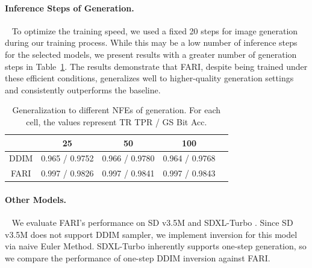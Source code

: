\documentclass{article}
\begin{document}
\begin{table}[htbp]
\caption{Generalization to different samplers. For each cell, the values represent TR TPR / GS Bit Acc.}
\label{tab:samplers}
\centering
{}
\end{table}

\paragraph{Inference Steps of Generation.}~ To optimize the training speed, we used a fixed 20 steps for image generation during our training process. While this may be a low number of inference steps for the selected models, we present results with a greater number of generation steps in Table~\ref{tab:gen_nfe}. The results demonstrate that FARI, despite being trained under these efficient conditions, generalizes well to higher-quality generation settings and consistently outperforms the baseline.

\begin{table}[htbp]
\caption{Generalization to different NFEs of generation. For each cell, the values represent TR TPR / GS Bit Acc.}
\label{tab:gen_nfe}
\centering
\begin{tabular}{ccccc}
\toprule
  & 25 & 50 & 100  \\
\midrule
DDIM  & 0.965 / 0.9752 & 0.966 / 0.9780 & 0.964 / 0.9768 \\
FARI  & 0.997 / 0.9826 & 0.997 / 0.9841 & 0.997 / 0.9843 \\
\bottomrule
\end{tabular}
\end{table}

\paragraph{Other Models.}~ We evaluate FARI's performance on SD v3.5M \citep{sd3_2024} and SDXL-Turbo \citep{sdxl2023}. Since SD v3.5M does not support DDIM sampler, we implement inversion for this model via naive Euler Method. SDXL-Turbo inherently supports one-step generation, so we compare the performance of one-step DDIM inversion against FARI.
\end{document}
